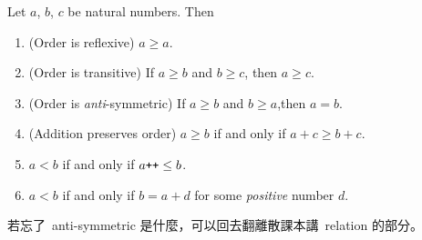 \begin{proposition}  \label{prop 2.2.12}
Let \(a\), \(b\), \(c\) be natural numbers. Then
    \begin{enumerate}
        \item (Order is reflexive) \(a \geq a\).
        \item (Order is transitive) If \(a \geq b\) and \(b \geq c\), then \(a \geq c\).
        \item (Order is \emph{anti}-symmetric) If \(a \geq b\) and \(b \geq a\),then \(a = b\). 
        \item (Addition preserves order) \(a \geq b\) if and only if \(a + c \geq b + c\). 
        \item \(a < b\) if and only if \(a\texttt{++} \leq b\).
        \item \(a < b\) if and only if \(b = a + d\) for some \emph{positive} number \(d\).
    \end{enumerate}
\end{proposition}
\begin{note}
若忘了\ anti-symmetric 是什麼，可以回去翻離散課本講\ relation 的部分。
\end{note}
